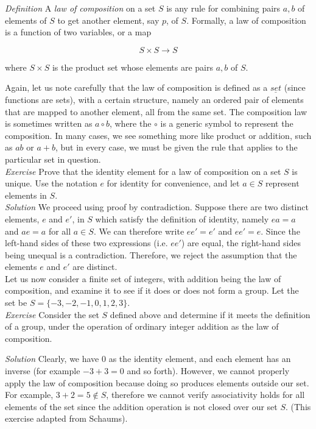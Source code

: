 \textit{Definition} A \textit{law of composition} on a set $S$ is any rule for combining pairs $a,b$ of elements of $S$ to get another element, say $p$, of $S$.  Formally, a law of composition is a function of two variables, or a map

\begin{displaymath}
S \times S \rightarrow S
\end{displaymath}

where $S \times S$ is the product set whose elements are pairs $a,b$ of $S$.

Again, let us note carefully that the law of composition is defined as a $\underline{set}$ (since functions are sets), with a certain structure, namely an ordered pair of elements that are mapped to another element, all from the same set.  The composition law is sometimes written as $a \circ b$, where the $\circ$ is a generic symbol to represent the composition.  In many cases, we see something more like product or addition, such as $ab$ or $a+b$, but in every case, we must be given the rule that applies to the particular set in question.\\


\textit{Exercise} Prove that the identity element for a law of composition on a set $S$ is unique.  Use the notation $e$ for identity for convenience, and let $a \in S$ represent elements in $S$.\\

\textit{Solution}  We proceed using proof by contradiction.  Suppose there are two distinct elements, $e$ and $e'$, in $S$ which satisfy the definition of identity, namely $ea=a$ and $ae=a$ for all $a \in S$.  We can therefore write $ee'=e'$ and $ee'=e$.  Since the left-hand sides of these two expressions (i.e. $ee'$) are equal, the right-hand sides being unequal is a contradiction.  Therefore, we reject the assumption that the elements $e$ and $e'$ are distinct.\\

Let us now consider a finite set of integers, with addition being the law of composition, and examine it to see if it does or does not form a group.  Let the set be $S=\{-3, -2, -1, 0, 1, 2, 3\}$.\\

\textit{Exercise} Consider the set $S$ defined above and determine if it meets the definition of a group, under the operation of ordinary integer addition as the law of composition.

\textit{Solution} Clearly, we have $0$ as the identity element, and each element has an inverse (for example $-3+3=0$ and so forth).  However, we cannot properly apply the law of composition because doing so produces elements outside our set.  For example, $3+2=5 \notin S$, therefore we cannot verify associativity holds for all elements of the set since the addition operation is not closed over our set $S$.  (This exercise adapted from Schaums).\\

